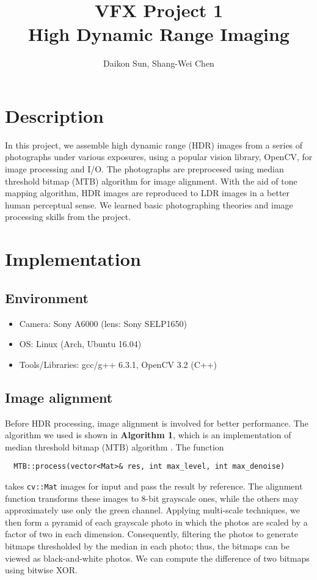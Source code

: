 \documentclass[11pt]{article}
\title{\bf{VFX Project 1\\\large{High Dynamic Range Imaging}}}
\author{Daikon Sun, Shang-Wei Chen}
\date{}
\begin{document}
\maketitle
\section{Description}
In this project, we assemble high dynamic range (HDR) images from a series of photographs under various exposures, using a popular vision library, OpenCV, for image processing and I/O. The photographs are preprocesed using median threshold bitmap (MTB) algorithm for image alignment. With the aid of tone mapping algorithm, HDR images are reproduced to LDR images in a better human perceptual sense. We learned basic photographing theories and image processing skills from the project. 

\section{Implementation}
\subsection{Environment}
\begin{itemize}
	\itemsep=0pt
	\item Camera: Sony A6000 (lens: Sony SELP1650)
	\item OS: Linux (Arch, Ubuntu 16.04)
	\item Tools/Libraries: gcc/g++ 6.3.1, OpenCV 3.2 (C++)
\end{itemize}

\subsection{Image alignment}
Before HDR processing, image alignment is involved for better performance.
The algorithm we used is shown in \textbf{Algorithm 1}, 
which is an implementation of median threshold bitmap (MTB) algorithm \cite{ref:Ward}.
The function 
\begin{lstlisting}
  MTB::process(vector<Mat>& res, int max_level, int max_denoise)
\end{lstlisting}
takes \texttt{cv::Mat} images for input and pass the result by reference.
The alignment function transforms these images to 8-bit grayscale ones,
while the others may approximately use only the green channel.
Applying multi-scale techniques, we then form a pyramid of each grayscale photo 
in which the photos are scaled by a factor of two in each dimension.
Consequently, filtering the photos to generate bitmaps thresholded by the median
in each photo; thus, the bitmaps can be viewed as black-and-white photos.
We can compute the difference of two bitmaps using bitwise XOR.
\end{document}
